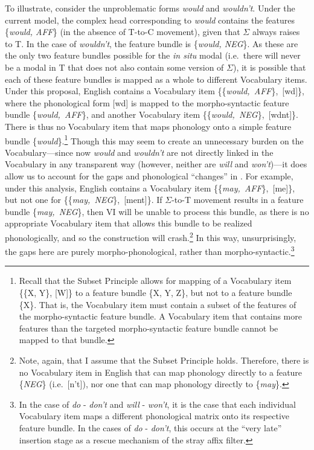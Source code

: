 To illustrate, consider the unproblematic forms {\it would} and {\it wouldn't}. Under the current model, the complex head corresponding to {\it would} contains the features \{{\it would, \mbox{\small{AFF}}}\} (in the absence of T-to-C movement), given that $\Sigma$ always raises to T. In the case of {\it wouldn't}, the feature bundle is \{{\it would, \mbox{\small{NEG}}}\}. As these are the only two feature bundles possible for the {\it in situ} modal (i.e.\ there will never be a modal in T that does not also contain some version of $\Sigma$), it is possible that each of these feature bundles is mapped as a whole to different Vocabulary items. Under this proposal, English contains a Vocabulary item \{\{{\it would,~\mbox{\small{AFF}}}\},~[w\textupsilon d]\}, where the phonological form [w\textupsilon d] is mapped to the morpho-syntactic feature bundle \{{\it would,~\mbox{\small{AFF}}}\}, and another Vocabulary item \{\{{\it would,~\mbox{\small{NEG}}}\},~[w\textupsilon dnt]\}. There is thus no Vocabulary item that maps phonology onto a simple feature bundle \{{\it would}\}.\footnote{Recall that the Subset Principle allows for mapping of a Vocabulary item \{\{X, Y\}, [W]\} to a feature bundle \{X, Y, Z\}, but not to a feature bundle \{X\}. That is, the Vocabulary item must contain a subset of the features of the morpho-syntactic feature bundle. A Vocabulary item that contains more features than the targeted morpho-syntactic feature bundle cannot be mapped to that bundle.} Though this may seem to create an unnecessary burden on the Vocabulary---since now {\it would} and {\it wouldn't} are not directly linked in the Vocabulary in any transparent way (however, neither are {\it will} and {\it won't})---it does allow us to account for the gaps and phonological ``changes'' in \Last. For example, under this analysis, English contains a Vocabulary item \{\{{\it may,~\mbox{\small{AFF}}}\},~[me\textsci ]\}, but not one for \{\{{\it may,~\mbox{\small{NEG}}}\},~[me\textsci nt]\}. If $\Sigma$-to-T movement results in a feature bundle \{{\it may,~\mbox{\small{NEG}}}\}, then VI will be unable to process this bundle, as there is no appropriate Vocabulary item that allows this bundle to be realized phonologically, and so the construction will crash.\footnote{Note, again, that I assume that the Subset Principle holds. Therefore, there is no Vocabulary item in English that can map phonology directly to a feature \{{\it \mbox{\small{NEG}}}\} (i.e.\ [n't]), nor one that can map phonology directly to \{{\it may}\}.} In this way, unsurprisingly, the gaps here are purely morpho-phonological, rather than morpho-syntactic.\footnote{In the case of {\it do} - {\it don't} and {\it will} - {\it won't}, it is the case that each individual Vocabulary item maps a different phonological matrix onto its respective feature bundle. In the cases of {\it do} - {\it don't}, this occurs at the ``very late'' insertion stage as a rescue mechanism of the stray affix filter.}

